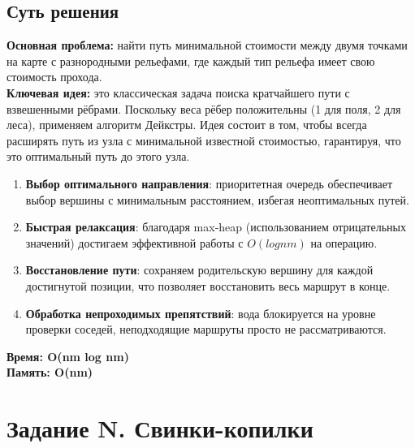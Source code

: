 \documentclass[a4paper,12pt]{article}
\begin{document}
    \subsection*{Суть решения}
    \textbf{Основная проблема:} найти путь минимальной стоимости между двумя точками на карте с разнородными рельефами, где каждый тип рельефа имеет свою стоимость прохода.\\
    \textbf{Ключевая идея:} это классическая задача поиска кратчайшего пути с взвешенными рёбрами. Поскольку веса рёбер положительны (1 для поля, 2 для леса), применяем алгоритм Дейкстры. Идея состоит в том, чтобы всегда расширять путь из узла с минимальной известной стоимостью, гарантируя, что это оптимальный путь до этого узла.\\
    \begin{enumerate}
        \item \textbf{Выбор оптимального направления}: приоритетная очередь обеспечивает выбор вершины с минимальным расстоянием, избегая неоптимальных путей.
        \item \textbf{Быстрая релаксация}: благодаря max-heap (использованием отрицательных значений) достигаем эффективной работы с $O(log nm)$ на операцию.
        \item \textbf{Восстановление пути}: сохраняем родительскую вершину для каждой достигнутой позиции, что позволяет восстановить весь маршрут в конце.
        \item \textbf{Обработка непроходимых препятствий}: вода блокируется на уровне проверки соседей, неподходящие маршруты просто не рассматриваются.
    \end{enumerate}
    \textbf{Время: O(nm log nm)}\\
    \textbf{Память: O(nm)}


    \newpage


    \section{Задание N. Свинки-копилки}

    
\end{document}
